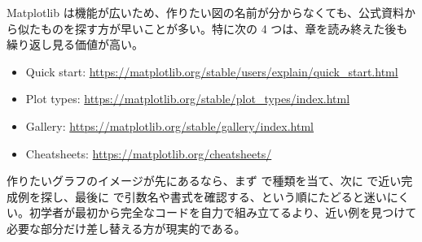 Matplotlib は機能が広いため、作りたい図の名前が分からなくても、公式資料から似たものを探す方が早いことが多い。特に次の 4 つは、章を読み終えた後も繰り返し見る価値が高い。

\begin{itemize}
\item Quick start: \url{https://matplotlib.org/stable/users/explain/quick_start.html}
\item Plot types: \url{https://matplotlib.org/stable/plot_types/index.html}
\item Gallery: \url{https://matplotlib.org/stable/gallery/index.html}
\item Cheatsheets: \url{https://matplotlib.org/cheatsheets/}
\end{itemize}

作りたいグラフのイメージが先にあるなら、まず  で種類を当て、次に  で近い完成例を探し、最後に  で引数名や書式を確認する、という順にたどると迷いにくい。初学者が最初から完全なコードを自力で組み立てるより、近い例を見つけて必要な部分だけ差し替える方が現実的である。
